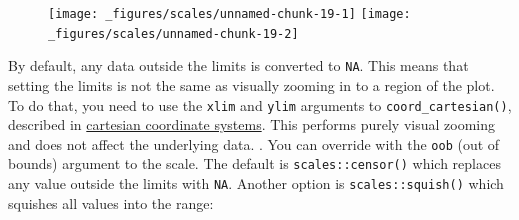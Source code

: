\begin{Shaded}
\begin{Highlighting}[]
\StringTok{ }
\StringTok{  }\NormalTok{(}\NormalTok{(} \StringTok{ }
\StringTok{  }\NormalTok{(} \NormalTok{)}
\StringTok{ }
\StringTok{  }\NormalTok{(}\NormalTok{(} \StringTok{ }
\StringTok{  }\NormalTok{(} \NormalTok{(}\NormalTok{,}\NormalTok{)) +}\StringTok{ }
\StringTok{  }\NormalTok{(} \NormalTok{(}\NormalTok{,}\NormalTok{)) +}
\StringTok{  }\NormalTok{(} \NormalTok{)}
\end{Highlighting}
\end{Shaded}

\begin{figure}[H]
  \centering
  \texttt{[image: \_figures/scales/unnamed-chunk-19-1]}%
  \texttt{[image: \_figures/scales/unnamed-chunk-19-2]}
\end{figure}

By default, any data outside the limits is converted to \texttt{NA}.
This means that setting the limits is not the same as visually zooming
in to a region of the plot. To do that, you need to use the
\texttt{xlim} and \texttt{ylim} arguments to
\texttt{coord\_cartesian()}, described in
\hyperref[sub:cartesian]{cartesian coordinate systems}. This performs
purely visual zooming and does not affect the underlying data.
. You can override with the \texttt{oob} (out of bounds)
argument to the scale. The default is \texttt{scales::censor()} which
replaces any value outside the limits with \texttt{NA}. Another option
is \texttt{scales::squish()} which squishes all values into the range:

